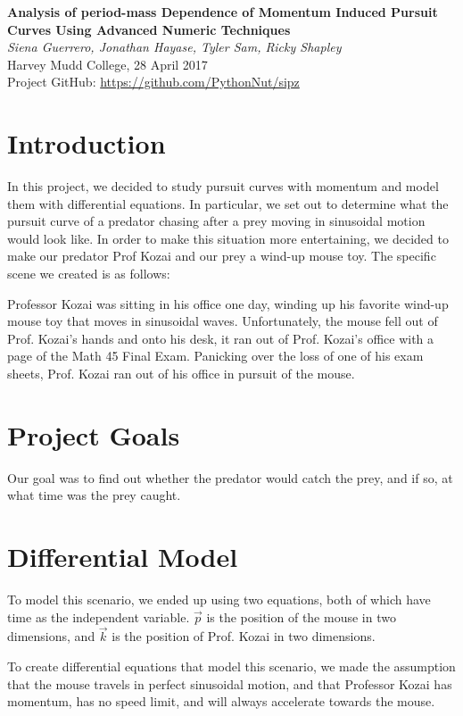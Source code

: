 \documentclass{article}
\begin{document}
\begin{center}
  {\LARGE \textbf{Analysis of period-mass Dependence of Momentum Induced Pursuit Curves Using Advanced Numeric Techniques}}\\[.1in]
  \large{\textit{Siena Guerrero, Jonathan Hayase, Tyler Sam, Ricky Shapley}}\\[0.2em]
  \normalsize
    Harvey Mudd College, 28 April 2017\\
    Project GitHub: \url{https://github.com/PythonNut/sipz}
\end{center}

\begin{multicols}{2}
  \section{Introduction}
  In this project, we decided to study pursuit curves with momentum and model them with differential equations. In particular, we set out to determine what the pursuit curve of a predator chasing after a prey moving in sinusoidal motion would look like. In order to make this situation more entertaining, we decided to make our predator Prof Kozai and our prey a wind-up mouse toy. The specific scene we created is as follows:

  Professor Kozai was sitting in his office one day, winding up his favorite wind-up mouse toy that moves in sinusoidal waves. Unfortunately, the mouse fell out of Prof. Kozai’s hands and onto his desk, it ran out of Prof. Kozai’s office with a page of the Math 45 Final Exam. Panicking over the loss of one of his exam sheets, Prof. Kozai ran out of his office in pursuit of the mouse.

  \section{Project Goals}
  Our goal was to find out whether the predator would catch the prey, and if so, at what time was the prey caught.

  \section{Differential Model}
  To model this scenario, we ended up using two equations, both of which have time as the independent variable. $\vec p$ is the position of the mouse in two dimensions, and $\vec k$ is the position of Prof. Kozai in two dimensions.

  To create differential equations that model this scenario, we made the assumption that the mouse travels in perfect sinusoidal motion, and that Professor Kozai has momentum, has no speed limit, and will always accelerate towards the mouse.


\end{multicols}
\end{document}
